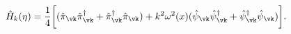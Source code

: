 \begin{equation}
\hat{H}_{k}(\eta) = \frac{1}{4} \biggl[(\hat{\pi}_{\vk} \hat{\pi}^{\dagger}_{\vk} + 
\hat{\pi}_{\vk}^{\dagger} \hat{\pi}_{\vk}) + k^2\omega^2(x) (\hat{\psi}_{\vk} \hat{\psi}^{\dagger}_{\vk} + 
\hat{\psi}_{\vk}^{\dagger} \hat{\psi}_{\vk})\biggr].
\label{ham4}
\end{equation}


